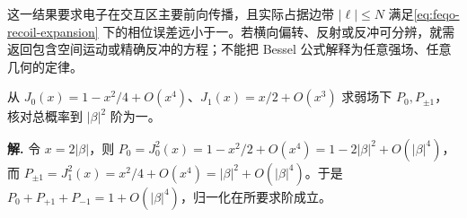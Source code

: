 这一结果要求电子在交互区主要前向传播，且实际占据边带 \(|\ell|\leq N\) 满足\cref{eq:feqo-recoil-expansion} 下的相位误差远小于一。若横向偏转、反射或反冲可分辨，就需返回包含空间运动或精确反冲的方程；不能把 Bessel 公式解释为任意强场、任意几何的定律。



\par
\begin{workedexample}
从 \(J_0(x)=1-x^2/4+O(x^4)\)、\(J_1(x)=x/2+O(x^3)\) 求弱场下 \(P_0,P_{\pm1}\)，核对总概率到 \(|\beta|^2\) 阶为一。

\textbf{解.} 令 \(x=2|\beta|\)，则 \(P_0=J_0^2(x)=1-x^2/2+O(x^4)=1-2|\beta|^2+O(|\beta|^4)\)，而 \(P_{\pm1}=J_1^2(x)=x^2/4+O(x^4)=|\beta|^2+O(|\beta|^4)\)。于是 \(P_0+P_{+1}+P_{-1}=1+O(|\beta|^4)\)，归一化在所要求阶成立。
\end{workedexample}
\par
